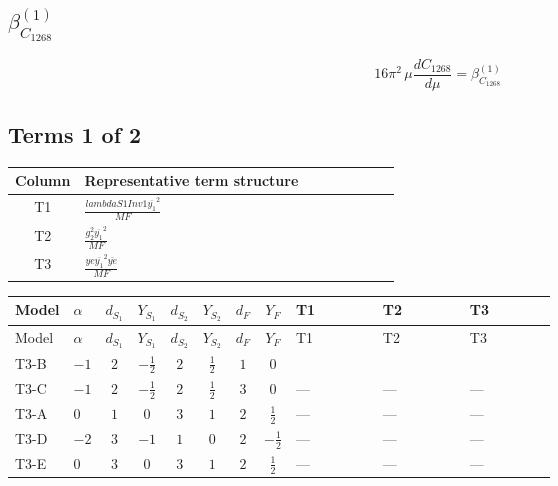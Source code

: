 \documentclass[8pt]{article}
\begin{document}
\begin{landscape}
\section*{$\beta_{C_{1268}}^{(1)}$}
\[16\pi^2\,\mu\frac{d C_{1268}}{d\mu}=\beta_{C_{1268}}^{(1)}\]
\subsection*{Terms 1 of 2}
\begin{center}
\begin{tabular}{@{}c >{\raggedright\arraybackslash}p{0.82\linewidth}@{}}
\toprule
Column & Representative term structure \\
\midrule
T1 & \(\displaystyle \frac{lambdaS1Inv1 \overline{y_{1}}^{2}}{MF}\) \\
\midrule
T2 & \(\displaystyle \frac{g_{2}^{2} \overline{y_{1}}^{2}}{MF}\) \\
\midrule
T3 & \(\displaystyle \frac{ye \overline{y_{1}}^{2} \overline{ye}}{MF}\) \\
\midrule
\bottomrule
\end{tabular}
\end{center}
\smallskip
\tiny
\begin{longtable}{@{}llcccccc >{\raggedright\arraybackslash}p{0.21\linewidth} >{\raggedright\arraybackslash}p{0.21\linewidth} >{\raggedright\arraybackslash}p{0.21\linewidth}@{}}
\toprule
Model & $\alpha$ & $d_{S_1}$ & $Y_{S_1}$ & $d_{S_2}$ & $Y_{S_2}$ & $d_F$ & $Y_F$ & T1 & T2 & T3 \\
\midrule
\endfirsthead
\toprule
Model & $\alpha$ & $d_{S_1}$ & $Y_{S_1}$ & $d_{S_2}$ & $Y_{S_2}$ & $d_F$ & $Y_F$ & T1 & T2 & T3 \\
\midrule
\endhead
T3-B & $-1$ & $2$ & $-\frac{1}{2}$ & $2$ & $\frac{1}{2}$ & $1$ & $0$ & \scriptsize\adjustbox{max width=\linewidth}{$\begin{gathered} \frac{lambdaS1Inv1 \overline{y_{1}}^{2}}{4 MF}\end{gathered}$} & \scriptsize\adjustbox{max width=\linewidth}{$\begin{gathered} \frac{3 g_{2}^{2} \overline{y_{1}}^{2}}{8 MF}\end{gathered}$} & \scriptsize\adjustbox{max width=\linewidth}{$\begin{gathered} - \frac{ye \overline{y_{1}}^{2} \overline{ye}}{8 MF}\end{gathered}$} \\
\midrule
T3-C & $-1$ & $2$ & $-\frac{1}{2}$ & $2$ & $\frac{1}{2}$ & $3$ & $0$ & --- & --- & --- \\
\midrule
T3-A & $0$ & $1$ & $0$ & $3$ & $1$ & $2$ & $\frac{1}{2}$ & --- & --- & --- \\
\midrule
T3-D & $-2$ & $3$ & $-1$ & $1$ & $0$ & $2$ & $-\frac{1}{2}$ & --- & --- & --- \\
\midrule
T3-E & $0$ & $3$ & $0$ & $3$ & $1$ & $2$ & $\frac{1}{2}$ & --- & --- & --- \\
\midrule
\bottomrule
\end{longtable}
\clearpage

\end{landscape}
\end{document}
